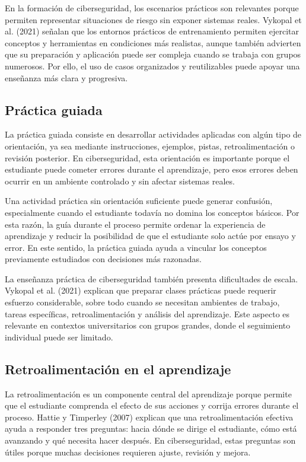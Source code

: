 En la formación de ciberseguridad, los escenarios prácticos son relevantes porque permiten representar situaciones de riesgo sin exponer sistemas reales. Vykopal et al. (2021) señalan que los entornos prácticos de entrenamiento permiten ejercitar conceptos y herramientas en condiciones más realistas, aunque también advierten que su preparación y aplicación puede ser compleja cuando se trabaja con grupos numerosos. Por ello, el uso de casos organizados y reutilizables puede apoyar una enseñanza más clara y progresiva.

\subsection{Práctica guiada}

La práctica guiada consiste en desarrollar actividades aplicadas con algún tipo de orientación, ya sea mediante instrucciones, ejemplos, pistas, retroalimentación o revisión posterior. En ciberseguridad, esta orientación es importante porque el estudiante puede cometer errores durante el aprendizaje, pero esos errores deben ocurrir en un ambiente controlado y sin afectar sistemas reales.

Una actividad práctica sin orientación suficiente puede generar confusión, especialmente cuando el estudiante todavía no domina los conceptos básicos. Por esta razón, la guía durante el proceso permite ordenar la experiencia de aprendizaje y reducir la posibilidad de que el estudiante solo actúe por ensayo y error. En este sentido, la práctica guiada ayuda a vincular los conceptos previamente estudiados con decisiones más razonadas.

La enseñanza práctica de ciberseguridad también presenta dificultades de escala. Vykopal et al. (2021) explican que preparar clases prácticas puede requerir esfuerzo considerable, sobre todo cuando se necesitan ambientes de trabajo, tareas específicas, retroalimentación y análisis del aprendizaje. Este aspecto es relevante en contextos universitarios con grupos grandes, donde el seguimiento individual puede ser limitado.

\subsection{Retroalimentación en el aprendizaje}

La retroalimentación es un componente central del aprendizaje porque permite que el estudiante comprenda el efecto de sus acciones y corrija errores durante el proceso. Hattie y Timperley (2007) explican que una retroalimentación efectiva ayuda a responder tres preguntas: hacia dónde se dirige el estudiante, cómo está avanzando y qué necesita hacer después. En ciberseguridad, estas preguntas son útiles porque muchas decisiones requieren ajuste, revisión y mejora.

